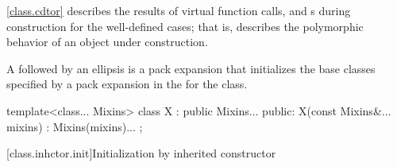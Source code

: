 \pnum
\begin{note}
\ref{class.cdtor} describes the results of virtual function calls,
and
s
during construction for the well-defined cases;
that is, describes the polymorphic behavior
of an object under construction.
\end{note}

\pnum
{}%
A  followed by an ellipsis is
a pack expansion that initializes the base
classes specified by a pack expansion in the 
for the class.
\begin{example}
\begin{codeblock}
template<class... Mixins>
class X : public Mixins... {
public:
  X(const Mixins&... mixins) : Mixins(mixins)... { }
};
\end{codeblock}

\end{example}

[class.inhctor.init]{Initialization by inherited constructor}%

